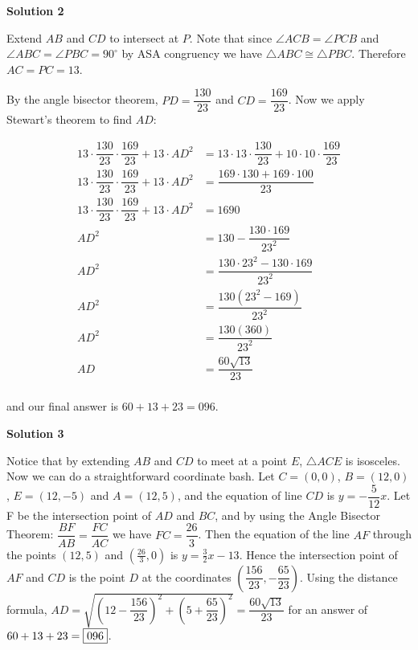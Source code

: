 \begin{enumerate}
 



\textbf{Solution 2}

Extend $AB$ and $CD$ to intersect at $P$. Note that since $\angle ACB=\angle PCB$ and $\angle ABC=\angle PBC=90^{\circ}$ by ASA congruency we have $\triangle ABC\cong \triangle PBC$. Therefore $AC=PC=13$.

 By the angle bisector theorem, $PD=\dfrac{130}{23}$ and $CD=\dfrac{169}{23}$. Now we apply Stewart's theorem to find $AD$:

 
 \begin{align*}13\cdot \dfrac{130}{23}\cdot \dfrac{169}{23}+13\cdot AD^2&=13\cdot 13\cdot \dfrac{130}{23}+10\cdot 10\cdot \dfrac{169}{23}\\ 13\cdot \dfrac{130}{23}\cdot \dfrac{169}{23}+13\cdot AD^2&=\dfrac{169\cdot 130+169\cdot 100}{23}\\ 13\cdot \dfrac{130}{23}\cdot \dfrac{169}{23}+13\cdot AD^2&=1690\\ AD^2&=130-\dfrac{130\cdot 169}{23^2}\\ AD^2&=\dfrac{130\cdot 23^2-130\cdot 169}{23^2}\\ AD^2&=\dfrac{130(23^2-169)}{23^2}\\ AD^2&=\dfrac{130(360)}{23^2}\\ AD&=\dfrac{60\sqrt{13}}{23}\\ \end{align*}


 and our final answer is $60+13+23=\boxed{096}$.

 



\textbf{Solution 3}

Notice that by extending $AB$ and $CD$ to meet at a point $E$, $\triangle ACE$ is isosceles. Now we can do a straightforward coordinate bash. Let $C=(0,0)$, $B=(12,0)$, $E=(12,-5)$ and $A=(12,5)$, and the equation of line $CD$ is $y=-\dfrac{5}{12}x$. Let F be the intersection point of $AD$ and $BC$, and by using the Angle Bisector Theorem: $\dfrac{BF}{AB}=\dfrac{FC}{AC}$ we have $FC=\dfrac{26}{3}$. Then the equation of the line $AF$ through the points $(12,5)$ and $\left(\frac{26}{3},0\right)$ is $y=\frac32 x-13$. Hence the intersection point of $AF$ and $CD$ is the point $D$ at the coordinates $\left(\dfrac{156}{23},-\dfrac{65}{23}\right)$. Using the distance formula, $AD=\sqrt{\left(12-\dfrac{156}{23}\right)^2+\left(5+\dfrac{65}{23}\right)^2}=\dfrac{60\sqrt{13}}{23}$ for an answer of $60+13+23=\fbox{096}$.


\end{enumerate}
